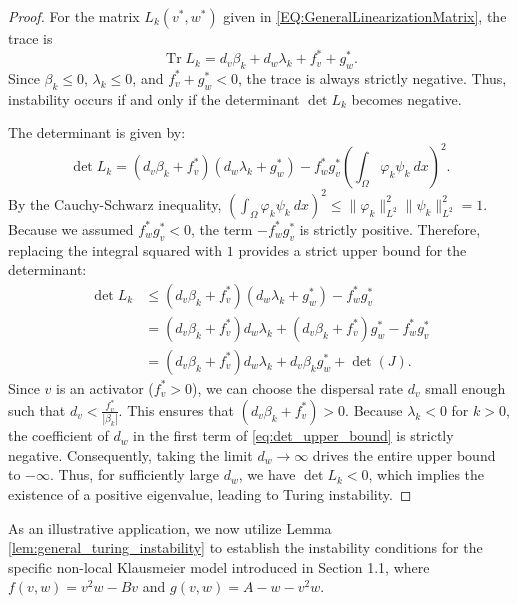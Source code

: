 \documentclass[11pt, a4paper]{article}
\theoremstyle{break}
\theoremstyle{break}
\theoremstyle{break}
\theoremstyle{break}
\theoremstyle{break}
\theoremstyle{break}
\theoremstyle{break}
\theoremstyle{break}
\theoremstyle{break}
\DeclareMathOperator{\Tr}{Tr}
\begin{document}
\begin{proof}
    For the matrix $L_k(v^*, w^*)$ given in \eqref{EQ:GeneralLinearizationMatrix}, the trace is 
    \begin{equation}
        \Tr L_k = d_v \beta_k + d_w \lambda_k + f_v^* + g_w^*.
    \end{equation}
    Since $\beta_k \le 0$, $\lambda_k \le 0$, and $f_v^* + g_w^* < 0$, the trace is always strictly negative. Thus, instability occurs if and only if the determinant $\det L_k$ becomes negative. 
    
    The determinant is given by:
    \begin{equation}
        \det L_k = (d_v \beta_k + f_v^*)(d_w \lambda_k + g_w^*) - f_w^* g_v^* \left(\int_\Omega \varphi_k \psi_k \:dx\right)^2.
    \end{equation}
    By the Cauchy-Schwarz inequality, $\left(\int_\Omega \varphi_k \psi_k \:dx\right)^2 \leq \|\varphi_k\|_{L^2}^2 \|\psi_k\|_{L^2}^2 = 1$. Because we assumed $f_w^* g_v^* < 0$, the term $-f_w^* g_v^*$ is strictly positive. Therefore, replacing the integral squared with $1$ provides a strict upper bound for the determinant:
    \begin{align}
        \det L_k &\leq (d_v \beta_k + f_v^*)(d_w \lambda_k + g_w^*) - f_w^* g_v^* \nonumber \\
        &= (d_v \beta_k + f_v^*) d_w \lambda_k + (d_v \beta_k + f_v^*) g_w^* - f_w^* g_v^* \nonumber \\
        &= (d_v \beta_k + f_v^*) d_w \lambda_k + d_v \beta_k g_w^* + \det(J). \label{eq:det_upper_bound}
    \end{align}
    Since $v$ is an activator ($f_v^* > 0$), we can choose the dispersal rate $d_v$ small enough such that $d_v < \frac{f_v^*}{|\beta_k|}$. This ensures that $(d_v \beta_k + f_v^*) > 0$. Because $\lambda_k < 0$ for $k > 0$, the coefficient of $d_w$ in the first term of \eqref{eq:det_upper_bound} is strictly negative. Consequently, taking the limit $d_w \to \infty$ drives the entire upper bound to $-\infty$. Thus, for sufficiently large $d_w$, we have $\det L_k < 0$, which implies the existence of a positive eigenvalue, leading to Turing instability.
\end{proof}

As an illustrative application, we now utilize Lemma \ref{lem:general_turing_instability} to establish the instability conditions for the specific non-local Klausmeier model introduced in Section 1.1, where $f(v,w) = v^2 w - Bv$ and $g(v,w) = A - w - v^2 w$.
\end{document}

